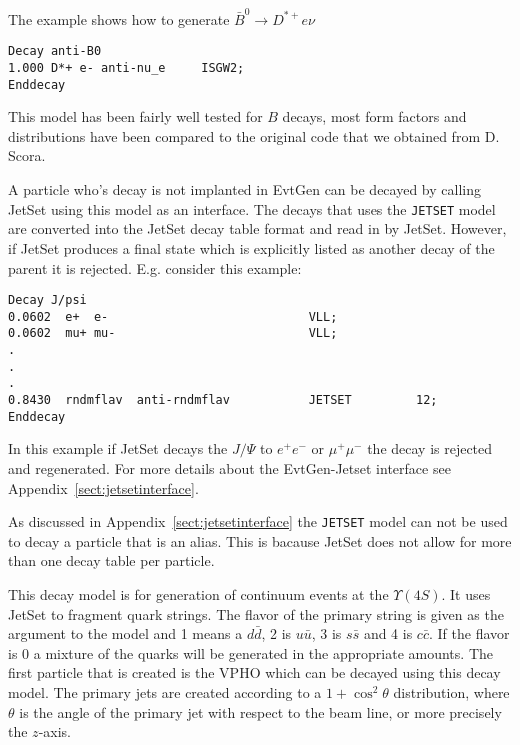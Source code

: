 \Example
The example shows how to generate $\bar B^0\rightarrow D^{*+}e\nu$
\begin{verbatim}
Decay anti-B0
1.000 D*+ e- anti-nu_e     ISGW2;
Enddecay
\end{verbatim}

\Notes
This model has been fairly well tested for $B$ decays, most form
factors and distributions have been compared to the original 
code that we obtained from D. Scora.



\label{jetset}



\Expl
A particle who's decay is not implanted in EvtGen
can be decayed by calling JetSet using this model as an interface.
The decays that uses the {\tt JETSET} model are converted
into the JetSet decay table format and read in by JetSet.
However, if JetSet produces a final state which
is explicitly listed as another decay of the parent it
is rejected. E.g. consider this example:
\begin{verbatim}
Decay J/psi
0.0602  e+  e-                            VLL;
0.0602  mu+ mu-                           VLL;
.
.
.
0.8430  rndmflav  anti-rndmflav           JETSET         12;
Enddecay
\end{verbatim}
In this example if JetSet decays the $J/\Psi$ to $e^+e^-$
or $\mu^+\mu^-$ the decay is rejected and regenerated.
For more details about the EvtGen-Jetset interface see
Appendix~\ref{sect:jetsetinterface}.

\Notes
As discussed in Appendix~\ref{sect:jetsetinterface} the {\tt JETSET}
model can not be used to decay a particle that is an alias. This is 
bacause JetSet does not allow for more than one decay table per
particle.






\Expl
This decay model is for generation of continuum events at the 
$\Upsilon(4S)$. It uses JetSet to fragment quark strings. The
flavor of the primary string is given as the argument to the
model and 1 means a $d\bar d$, 2 is $u\bar u$, 3 is $s\bar s$ and
4 is $c\bar c$. If the flavor is 0 a mixture of the quarks will
be generated in the appropriate amounts. 
The first particle that is created is the VPHO which can be
decayed using this decay model.
The primary jets are created according to a $1+\cos^2\theta$
distribution, where $\theta$ is the angle of the primary jet
with respect to the beam line, or more precisely the $z$-axis.

